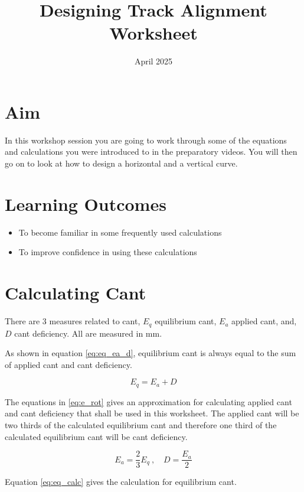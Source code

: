 \documentclass{bcrre_exam}
\title{Designing Track Alignment Worksheet}
\author{}
\date{April 2025}
\begin{document}
\maketitle

\section*{Aim}
In this workshop session you are going to work through some of the equations and calculations you were introduced to in the preparatory videos. You will then go on to look at how to design a horizontal and a vertical curve.

\section*{Learning Outcomes}

\begin{itemize}
    \item To become familiar in some frequently used calculations
    \item To improve confidence in using these calculations
\end{itemize}

\newpage
\section{Calculating Cant}

There are 3 measures related to cant, $E_q$ equilibrium cant, $E_a$ applied cant, and, $D$ cant deficiency. All are measured in \unit{mm}.

As shown in equation \ref{eq:eq_ea_d}, equilibrium cant is always equal to the sum of applied cant and cant deficiency.

\begin{equation}
    \label{eq:eq_ea_d}
    E_q = E_a+D
\end{equation}

The equations in \ref{eq:e_rot} gives an approximation for calculating applied cant and cant deficiency that shall be used in this worksheet. The applied cant will be two thirds of the calculated equilibrium cant and therefore one third of the calculated equilibrium cant will be cant deficiency.

\begin{equation}
    \label{eq:e_rot}
        E_a = \frac{2}{3}E_q\ , \quad
        D = \frac{E_a}{2}
\end{equation}

Equation \ref{eq:eq_calc} gives the calculation for equilibrium cant.
\end{document}
